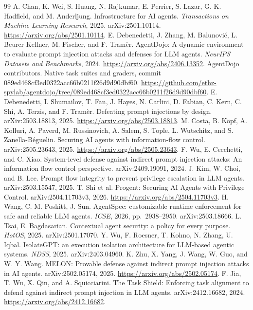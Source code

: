\begin{thebibliography}{99}
 A. Chan, K. Wei, S. Huang, N. Rajkumar, E. Perrier, S. Lazar, G. K. Hadfield, and M. Anderljung. Infrastructure for AI agents. \emph{Transactions on Machine Learning Research}, 2025. arXiv:2501.10114. \url{https://arxiv.org/abs/2501.10114}.
 E. Debenedetti, J. Zhang, M. Balunovi\'c, L. Beurer-Kellner, M. Fischer, and F. Tram\`er. AgentDojo: A dynamic environment to evaluate prompt injection attacks and defenses for LLM agents. \emph{NeurIPS Datasets and Benchmarks}, 2024. \url{https://arxiv.org/abs/2406.13352}.
 AgentDojo contributors. Native task suites and graders, commit 089ed468cf3ed0322acc66b0211f26d9d90dbf60. \url{https://github.com/ethz-spylab/agentdojo/tree/089ed468cf3ed0322acc66b0211f26d9d90dbf60}.
 E. Debenedetti, I. Shumailov, T. Fan, J. Hayes, N. Carlini, D. Fabian, C. Kern, C. Shi, A. Terzis, and F. Tram\`er. Defeating prompt injections by design. arXiv:2503.18813, 2025. \url{https://arxiv.org/abs/2503.18813}.
 M. Costa, B. K\"opf, A. Kolluri, A. Paverd, M. Russinovich, A. Salem, S. Tople, L. Wutschitz, and S. Zanella-B\'eguelin. Securing AI agents with information-flow control. arXiv:2505.23643, 2025. \url{https://arxiv.org/abs/2505.23643}.
 F. Wu, E. Cecchetti, and C. Xiao. System-level defense against indirect prompt injection attacks: An information flow control perspective. arXiv:2409.19091, 2024.
 J. Kim, W. Choi, and B. Lee. Prompt flow integrity to prevent privilege escalation in LLM agents. arXiv:2503.15547, 2025.
 T. Shi et al. Progent: Securing AI Agents with Privilege Control. arXiv:2504.11703v3, 2026. \url{https://arxiv.org/abs/2504.11703v3}.
 H. Wang, C. M. Poskitt, J. Sun. AgentSpec: customizable runtime enforcement for safe and reliable LLM agents. \emph{ICSE}, 2026, pp.~2938--2950. arXiv:2503.18666.
 L. Tsai, E. Bagdasarian. Contextual agent security: a policy for every purpose. \emph{HotOS}, 2025. arXiv:2501.17070.
 Y. Wu, F. Roesner, T. Kohno, N. Zhang, U. Iqbal. IsolateGPT: an execution isolation architecture for LLM-based agentic systems. \emph{NDSS}, 2025. arXiv:2403.04960.
 K. Zhu, X. Yang, J. Wang, W. Guo, and W. Y. Wang. MELON: Provable defense against indirect prompt injection attacks in AI agents. arXiv:2502.05174, 2025. \url{https://arxiv.org/abs/2502.05174}.
 F. Jia, T. Wu, X. Qin, and A. Squicciarini. The Task Shield: Enforcing task alignment to defend against indirect prompt injection in LLM agents. arXiv:2412.16682, 2024. \url{https://arxiv.org/abs/2412.16682}.

\end{thebibliography}
